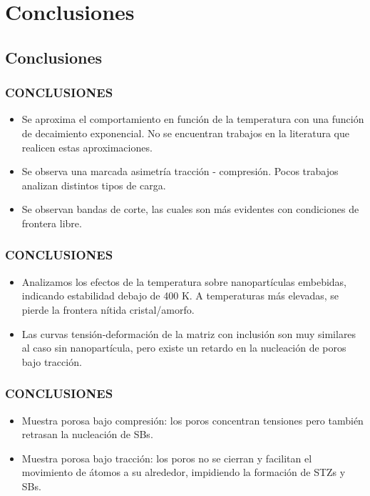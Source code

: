 
\section{Conclusiones}
\subsection{Conclusiones}

\begin{frame}
  \frametitle{CONCLUSIONES}
  \vspace{0.3cm}
 \begin{itemize} 
  \item Se aproxima el comportamiento en función de la temperatura con una función de decaimiento exponencial. No se encuentran trabajos en la literatura que realicen estas aproximaciones.
  \vspace{0.3cm}
  \item Se observa una marcada asimetría tracción - compresión. Pocos trabajos analizan distintos tipos de carga.
  \vspace{0.3cm}
  \item Se observan bandas de corte, las cuales son más evidentes con condiciones de frontera libre.
  \end{itemize}
\end{frame}

\begin{frame}
  \frametitle{CONCLUSIONES}
  \vspace{0.6cm}
 \begin{itemize} 
  \item Analizamos los efectos de la temperatura sobre nanopartículas embebidas, indicando estabilidad debajo de 400 K. A temperaturas más elevadas, se pierde la frontera nítida cristal/amorfo.
  \vspace{0.6cm}
  \item Las curvas tensión-deformación de la matriz con inclusión son muy similares al caso sin nanopartícula, pero existe un retardo en la nucleación de poros bajo tracción.
 \end{itemize}
\end{frame}

\begin{frame}
  \frametitle{CONCLUSIONES}
  \vspace{1cm}
 \begin{itemize}
  \item Muestra porosa bajo compresión: los poros concentran tensiones pero también retrasan la nucleación de SBs.
  \vspace{1cm}
  \item Muestra porosa bajo tracción: los poros no se cierran y facilitan el movimiento de átomos a su alrededor, impidiendo la formación de STZs y SBs.
 \end{itemize}
\end{frame}

